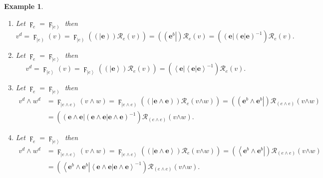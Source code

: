 \documentclass[aps,preprint]{revtex4}%
\newtheorem{example}[theorem]{Example}
\begin{document}
\begin{example}
\begin{enumerate}
\item Let $\digamma_{e}=\digamma_{\left\vert e\right)  }$ then
\begin{equation}
v^{d}=\digamma_{\left\vert e\right)  }\left(  v\right)  =\digamma_{\left\vert
e\right)  }\left(  \overset{}{\left(  \left\vert \mathbf{e}\right)  \right)
\mathcal{R}_{e}\left(  v\right)  }\right)  =\left(  \left(  \mathbf{e}%
^{b}\right\vert \right)  \mathcal{R}_{e}\left(  v\right)  =\left(  \left(
\mathbf{e}\right\vert \left(  \left.  \mathbf{e}\right\vert \mathbf{e}\right)
^{-1}\right)  \mathcal{R}_{e}\left(  v\right)  .
\end{equation}


\item Let $\digamma_{e}=\digamma_{\left\vert e\right\rangle }$ then
\begin{equation}
v^{d}=\digamma_{\left\vert e\right\rangle }\left(  v\right)  =\digamma
_{\left\vert e\right\rangle }\left(  \overset{}{\left(  \left\vert
\mathbf{e}\right\rangle \right)  \mathcal{R}_{e}\left(  v\right)  }\right)
=\left(  \left\langle \mathbf{e}\right\vert \left\langle \left.
\mathbf{e}\right\vert \mathbf{e}\right\rangle ^{-1}\right)  \mathcal{R}%
_{e}\left(  v\right)  .
\end{equation}


\item Let $\digamma_{e}=\digamma_{\left\vert e\right)  }$ then
\begin{align}
v^{d}\wedge w^{d}  &  =\digamma_{\left\vert e\wedge e\right)  }\left(  v\wedge
w\right)  =\digamma_{\left\vert e\wedge e\right)  }\left(  \overset{}{\left(
\left\vert \mathbf{e\wedge e}\right)  \right)  \mathcal{R}_{e}\left(
v\mathbf{\wedge}w\right)  }\right)  =\left(  \left(  \mathbf{e}^{b}%
\wedge\mathbf{e}^{b}\right\vert \right)  \mathcal{R}_{\left(  e\wedge
e\right)  }\left(  v\mathbf{\wedge}w\right) \\
&  =\left(  \left(  \mathbf{e\wedge e}\right\vert \left(  \left.
\mathbf{e\wedge e}\right\vert \mathbf{e\wedge e}\right)  ^{-1}\right)
\mathcal{R}_{\left(  e\wedge e\right)  }\left(  v\mathbf{\wedge}w\right)  .
\end{align}


\item Let $\digamma_{e}=\digamma_{\left\vert e\right\rangle }$ then
\begin{align}
v^{d}\wedge w^{d}  &  =\digamma_{\left\vert e\wedge e\right\rangle }\left(
v\wedge w\right)  =\digamma_{\left\vert e\wedge e\right\rangle }\left(
\overset{}{\left(  \left\vert \mathbf{e\wedge e}\right\rangle \right)
\mathcal{R}_{e}\left(  v\mathbf{\wedge}w\right)  }\right)  =\left(
\left\langle \mathbf{e}^{b}\wedge\mathbf{e}^{b}\right\vert \right)
\mathcal{R}_{\left(  e\wedge e\right)  }\left(  v\mathbf{\wedge}w\right) \\
&  =\left(  \left\langle \mathbf{e}^{b}\wedge\mathbf{e}^{b}\right\vert
\left\langle \left.  \mathbf{e\wedge e}\right\vert \mathbf{e\wedge
e}\right\rangle ^{-1}\right)  \mathcal{R}_{\left(  e\wedge e\right)  }\left(
v\mathbf{\wedge}w\right)  .
\end{align}


\end{enumerate}
\end{example}
\end{document}
